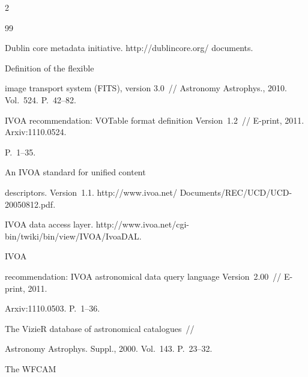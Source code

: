 \begin{multicols}{2}
{{\begin{thebibliography}{99}

Dublin core metadata initiative. {\sf http://dublincore.org/ documents}.



Definition of the flexible 

image transport system (FITS), version 3.0~// Astronomy Astrophys., 2010. Vol.~524. P.~42--82.



 IVOA  recommendation: VOTable format definition Version~1.2~// E-print, 2011. Arxiv:1110.0524. 

 P.~1--35.


 An IVOA standard for unified content 

descriptors. Version~1.1. {\sf http://www.ivoa.net/ Documents/REC/UCD/UCD-20050812.pdf}.


IVOA data access layer. {\sf http://www.ivoa.net/cgi-bin/\linebreak twiki/bin/view/IVOA/IvoaDAL}.


 IVOA 

recommendation: IVOA astronomical data query language Version~2.00~// E-print, 2011. 

Arxiv:1110.0503. P.~1--36.



The VizieR database of astronomical catalogues~// 

Astronomy Astrophys. Suppl., 2000. Vol.~143. P.~23--32.


 The WFCAM 


\end{thebibliography}}}
\end{multicols}
